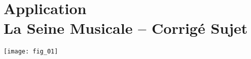 \chapter*{Application  \\ La Seine Musicale -- \ifprof Corrigé \else Sujet \fi}
\setcounter{question}{0}
\ifprof {} \else  \fi

\begin{marginfigure}
\texttt{[image: fig\_01]}
\end{marginfigure}

%
%
%
%
%
%
%
%
%
%
%
%
%
%
%
%
%
%

